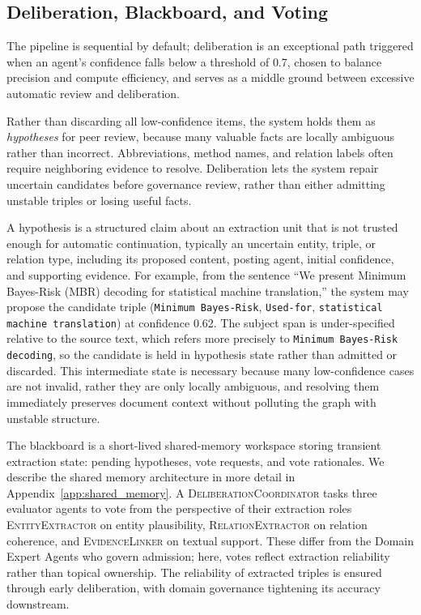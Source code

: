 \documentclass{article}
\begin{document}
\subsection{Deliberation, Blackboard, and Voting}

The pipeline is sequential by default; deliberation is an exceptional path triggered when an agent's confidence falls below a threshold of \textsc{0.7}, chosen to balance precision and compute efficiency, and serves as a middle ground between excessive automatic review and deliberation.

Rather than discarding all low-confidence items, the system holds them as \textit{hypotheses} for peer review, because many valuable facts are locally ambiguous rather than incorrect. Abbreviations, method names, and relation labels often require neighboring evidence to resolve. Deliberation lets the system repair uncertain candidates before governance review, rather than either admitting unstable triples or losing useful facts.

A hypothesis is a structured claim about an extraction unit that is not trusted enough for automatic continuation, typically an uncertain entity, triple, or relation  type, including its proposed content, posting agent, initial confidence, and supporting evidence. For example, from the sentence ``We present Minimum Bayes-Risk (MBR) decoding for statistical machine translation,'' the system may propose the candidate triple (\texttt{Minimum Bayes-Risk}, \texttt{Used-for}, \texttt{statistical machine translation}) at confidence 0.62. The subject span is under-specified relative to the source text, which refers more precisely to \texttt{Minimum Bayes-Risk decoding}, so the candidate is held in hypothesis state rather than admitted or discarded. This intermediate state is necessary because many low-confidence cases are not invalid, rather they are only locally ambiguous, and resolving them immediately preserves document context without polluting the graph with unstable structure.

The blackboard is a short-lived shared-memory workspace storing transient extraction state: pending hypotheses, vote requests, and vote rationales. We describe the shared memory architecture in more detail in Appendix~\ref{app:shared_memory}. A \textsc{DeliberationCoordinator} tasks three evaluator agents to vote from the perspective of their extraction roles \textsc{EntityExtractor} on entity plausibility, \textsc{RelationExtractor} on relation coherence, and \textsc{EvidenceLinker} on textual support. These differ from the Domain Expert Agents who govern admission; here, votes reflect extraction reliability rather than topical ownership. The reliability of extracted triples is ensured through early deliberation, with domain governance tightening its accuracy downstream.
\end{document}
